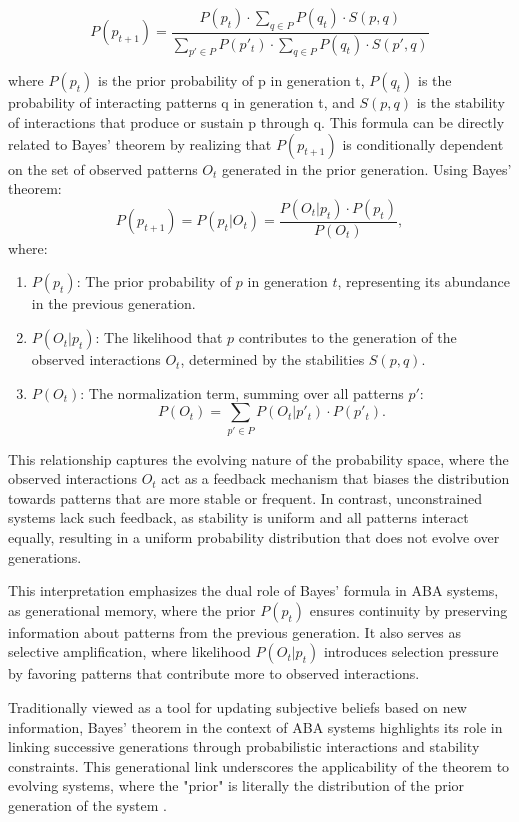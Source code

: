 \documentclass[entropy,article,submit,pdftex,oneauthor]{Definitions/mdpi}
\begin{document}
\begin{equation}
P(p_{t+1}) = \frac{P(p_t) \cdot \sum_{q \in P} P(q_t) \cdot S(p, q)}{\sum_{p' \in P} P(p'_t) \cdot \sum_{q \in P} P(q_t) \cdot S(p', q)}
\label{eq:bayes}
\end{equation}

where \( P(p_t) \) is the prior probability of p in generation t, \( P(q_t) \) is the probability of interacting patterns q in generation t, and \( S(p, q) \) is the stability of interactions that produce or sustain p through q. This formula can be directly related to Bayes' theorem by realizing that \( P(p_{t+1}) \) is conditionally dependent on the set of observed patterns \( O_t \) generated in the prior generation. Using Bayes' theorem:
\begin{equation}
P(p_{t+1}) = P(p_t | O_t) = \frac{P(O_t | p_t) \cdot P(p_t)}{P(O_t)},
\end{equation}
where:
\begin{enumerate}
    \item[] \( P(p_t) \): The prior probability of \( p \) in generation \( t \), representing its abundance in the previous generation.
    \item[] \( P(O_t | p_t) \): The likelihood that \( p \) contributes to the generation of the observed interactions \( O_t \), determined by the stabilities \( S(p, q) \).
    \item[] \( P(O_t) \): The normalization term, summing over all patterns \( p' \):
    \[
    P(O_t) = \sum_{p' \in P} P(O_t | p'_t) \cdot P(p'_t).
    \]
\end{enumerate}

This relationship captures the evolving nature of the probability space, where the observed interactions \( O_t \) act as a feedback mechanism that biases the distribution towards patterns that are more stable or frequent. In contrast, unconstrained systems lack such feedback, as stability is uniform and all patterns interact equally, resulting in a uniform probability distribution that does not evolve over generations. 

This interpretation emphasizes the dual role of Bayes' formula in ABA systems, as generational memory, where the prior \( P(p_t) \) ensures continuity by preserving information about patterns from the previous generation.
It also serves as selective amplification, where likelihood \( P(O_t | p_t) \) introduces selection pressure by favoring patterns that contribute more to observed interactions. 

Traditionally viewed as a tool for updating subjective beliefs based on new information, Bayes’ theorem in the context of ABA systems highlights its role in linking successive generations through probabilistic interactions and stability constraints. This generational link underscores the applicability of the theorem to evolving systems, where the "prior" is literally the distribution of the prior generation of the system \cite{le2020equation}.
\end{document}
